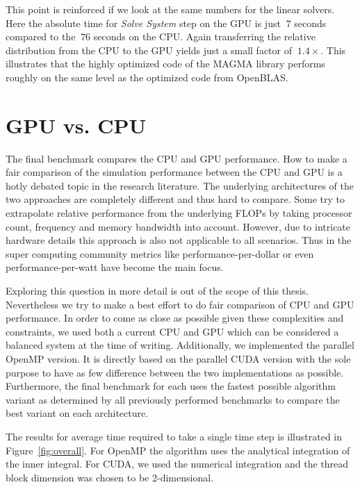\documentclass[a4paper,11pt]{kth-mag}
\begin{document}
This point is reinforced if we look at the same numbers for the linear solvers. Here the absolute time for \emph{Solve System} step on the GPU is just $~7$ seconds compared to the $~76$ seconds on the CPU. Again transferring the relative distribution from the CPU to the GPU yields just a small factor of $~1.4×$. This illustrates that the highly optimized code of the MAGMA library performs roughly on the same level as the optimized code from OpenBLAS.

\section{GPU vs. CPU}

The final benchmark compares the CPU and GPU performance. How to make a fair comparison of the simulation performance between the CPU and GPU is a hotly debated topic in the research literature\cite{Lee2010}\cite{Gregg2011}. The underlying architectures of the two approaches are completely different and thus hard to compare. Some try to extrapolate relative performance from the underlying FLOPs by taking processor count, frequency and memory bandwidth into account\cite{Lee2010}. However, due to intricate hardware details this approach is also not applicable to all scenarios. Thus in the super computing community metrics like performance-per-dollar or even performance-per-watt have become the main focus\cite{Kamil2008}.

Exploring this question in more detail is out of the scope of this thesis. Nevertheless we try to make a best effort to do fair comparison of CPU and GPU performance. In order to come as close as possible given these complexities and constraints, we used both a current CPU and GPU which can be considered a balanced system at the time of writing. Additionally, we implemented the parallel OpenMP version. It is directly based on the parallel CUDA version with the sole purpose to have as few difference between the two implementations as possible. Furthermore, the final benchmark for each uses the fastest possible algorithm variant as determined by all previously performed benchmarks to compare the best variant on each architecture.

The results for average time required to take a single time step is illustrated in Figure~\ref{fig:overall}. For OpenMP the algorithm uses the analytical integration of the inner integral. For CUDA, we used the numerical integration and the thread block dimension was chosen to be 2-dimensional.
\end{document}
